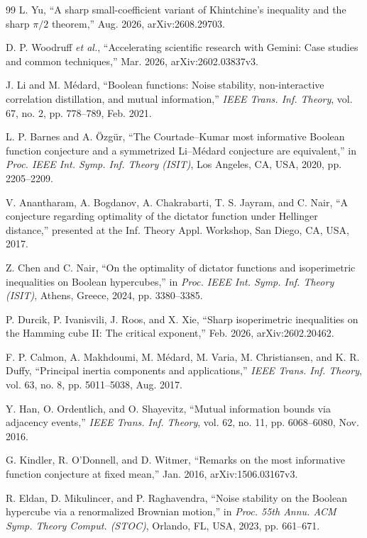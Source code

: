 \begin{thebibliography}{99}
L. Yu, ``A sharp small-coefficient variant of Khintchine's inequality
and the sharp $\pi/2$ theorem,'' Aug. 2026, arXiv:2608.29703.

D. P. Woodruff \emph{et al.}, ``Accelerating scientific research with
Gemini: Case studies and common techniques,'' Mar. 2026,
arXiv:2602.03837v3.

J. Li and M. M\'edard, ``Boolean functions: Noise stability,
non-interactive correlation distillation, and mutual information,''
\emph{IEEE Trans. Inf. Theory}, vol. 67, no. 2, pp. 778--789, Feb. 2021.

L. P. Barnes and A. \"Ozg\"ur, ``The Courtade--Kumar most informative
Boolean function conjecture and a symmetrized Li--M\'edard conjecture are
equivalent,'' in \emph{Proc. IEEE Int. Symp. Inf. Theory (ISIT)}, Los
Angeles, CA, USA, 2020, pp. 2205--2209.

V. Anantharam, A. Bogdanov, A. Chakrabarti, T. S. Jayram, and C. Nair,
``A conjecture regarding optimality of the dictator function under
Hellinger distance,'' presented at the Inf. Theory Appl. Workshop,
San Diego, CA, USA, 2017.

Z. Chen and C. Nair, ``On the optimality of dictator functions and
isoperimetric inequalities on Boolean hypercubes,'' in \emph{Proc. IEEE
Int. Symp. Inf. Theory (ISIT)}, Athens, Greece, 2024, pp. 3380--3385.

P. Durcik, P. Ivanisvili, J. Roos, and X. Xie, ``Sharp isoperimetric
inequalities on the Hamming cube II: The critical exponent,'' Feb. 2026,
arXiv:2602.20462.

F. P. Calmon, A. Makhdoumi, M. M\'edard, M. Varia, M. Christiansen, and
K. R. Duffy, ``Principal inertia components and applications,''
\emph{IEEE Trans. Inf. Theory}, vol. 63, no. 8, pp. 5011--5038,
Aug. 2017.

Y. Han, O. Ordentlich, and O. Shayevitz, ``Mutual information bounds via
adjacency events,'' \emph{IEEE Trans. Inf. Theory}, vol. 62, no. 11,
pp. 6068--6080, Nov. 2016.

G. Kindler, R. O'Donnell, and D. Witmer, ``Remarks on the most
informative function conjecture at fixed mean,'' Jan. 2016,
arXiv:1506.03167v3.


R. Eldan, D. Mikulincer, and P. Raghavendra, ``Noise stability on the
Boolean hypercube via a renormalized Brownian motion,'' in \emph{Proc.
55th Annu. ACM Symp. Theory Comput. (STOC)}, Orlando, FL, USA, 2023,
pp. 661--671.


\end{thebibliography}
